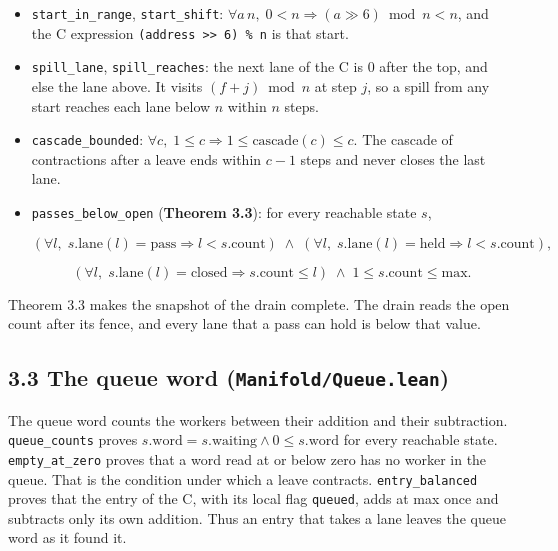 \begin{itemize}
\item \texttt{start\_\allowbreak{}in\_\allowbreak{}range}, \texttt{start\_\allowbreak{}shift}: \(\forall a\, n,\; 0 < n \Rightarrow (a \gg 6) \bmod n < n\), and the C expression \texttt{(address >> 6) \% n} is that start.
\item \texttt{spill\_\allowbreak{}lane}, \texttt{spill\_\allowbreak{}reaches}: the next lane of the C is 0 after the top, and else the lane above. It visits \((f + j) \bmod n\) at step \(j\), so a spill from any start reaches each lane below \(n\) within \(n\) steps.
\item \texttt{cascade\_\allowbreak{}bounded}: \(\forall c,\; 1 \le c \Rightarrow 1 \le \mathrm{cascade}(c) \le c\). The cascade of contractions after a leave ends within \(c - 1\) steps and never closes the last lane.
\item \texttt{passes\_\allowbreak{}below\_\allowbreak{}open} (\textbf{Theorem 3.3}): for every reachable state \(s\),

\[
(\forall l,\; s.\mathrm{lane}(l) = \mathrm{pass} \Rightarrow l < s.\mathrm{count}) \;\land\; (\forall l,\; s.\mathrm{lane}(l) = \mathrm{held} \Rightarrow l < s.\mathrm{count}),
\]

\[
(\forall l,\; s.\mathrm{lane}(l) = \mathrm{closed} \Rightarrow s.\mathrm{count} \le l) \;\land\; 1 \le s.\mathrm{count} \le \mathrm{max}.
\]
\end{itemize}

Theorem 3.3 makes the snapshot of the drain complete. The drain reads the open count after its fence, and every lane that a pass can hold is below that value.

\subsection{\texorpdfstring{3.3 The queue word (\texttt{Manifold/\allowbreak{}Queue.\allowbreak{}lean})}{3.3 The queue word (Manifold/Queue.lean)}}

The queue word counts the workers between their addition and their subtraction. \texttt{queue\_\allowbreak{}counts} proves \(s.\mathrm{word} = s.\mathrm{waiting} \land 0 \le s.\mathrm{word}\) for every reachable state. \texttt{empty\_\allowbreak{}at\_\allowbreak{}zero} proves that a word read at or below zero has no worker in the queue. That is the condition under which a leave contracts. \texttt{entry\_\allowbreak{}balanced} proves that the entry of the C, with its local flag \texttt{queued}, adds at max once and subtracts only its own addition. Thus an entry that takes a lane leaves the queue word as it found it.

